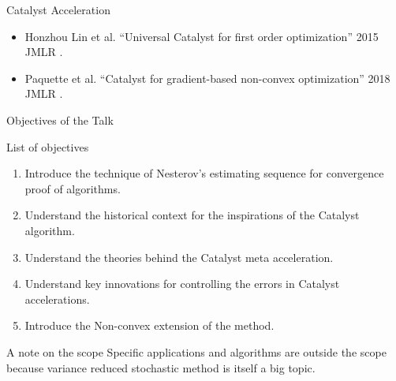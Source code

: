 \documentclass[11pt]{beamer}
\begin{document}
        \begin{frame}{Catalyst Acceleration}
            \begin{figure}
                \centering
            \end{figure}
            \begin{itemize}
                \item Honzhou Lin et al. ``Universal Catalyst for first order optimization'' 2015 JMLR \cite{lin_universal_2015}.
                \item Paquette et al. ``Catalyst for gradient-based non-convex optimization'' 2018 JMLR \cite{paquette_catalyst_2018}. 
            \end{itemize}
        \end{frame}
        \begin{frame}{Objectives of the Talk}
            \begin{block}{List of objectives}
                \begin{enumerate}
                    \item Introduce the technique of Nesterov's estimating sequence for convergence proof of algorithms. 
                    \item Understand the historical context for the inspirations of the Catalyst algorithm.  
                    \item Understand the theories behind the Catalyst meta acceleration. 
                    \item Understand key innovations for controlling the errors in Catalyst accelerations. 
                    \item Introduce the Non-convex extension of the method. 
                \end{enumerate}
            \end{block}
            \pause
            \begin{block}{A note on the scope}
                Specific applications and algorithms are outside the scope because variance reduced stochastic method is itself a big topic.     
            \end{block}
        \end{frame}
\end{document}
